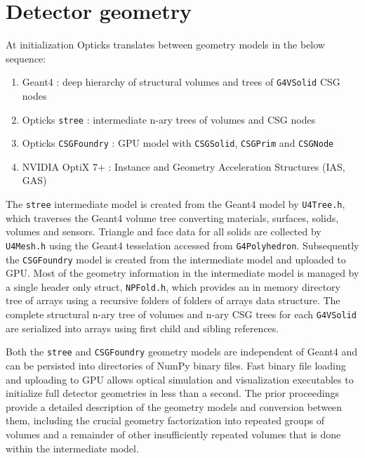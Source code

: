 \documentclass{webofc}
\begin{document}
\section{Detector geometry} 
\label{secgeom}%
At initialization Opticks translates between geometry models in the below sequence:
%
\begin{enumerate}
\item Geant4 : deep hierarchy of structural volumes and trees of {\tt G4VSolid} CSG nodes
\item Opticks {\tt stree} : intermediate n-ary trees of volumes and CSG nodes
\item Opticks {\tt CSGFoundry} : GPU model with {\tt CSGSolid}, {\tt CSGPrim} and {\tt CSGNode} 
\item NVIDIA OptiX 7+ : Instance and Geometry Acceleration Structures (IAS, GAS)
\end{enumerate}  
%
The {\tt stree} intermediate model is created from the Geant4 model by {\tt U4Tree.h},
which traverses the Geant4 volume tree converting materials, surfaces, solids, volumes and sensors.
Triangle and face data for all solids are collected by {\tt U4Mesh.h} using 
the Geant4 tesselation accessed from {\tt G4Polyhedron}. 
Subsequently the {\tt CSGFoundry} model is created from the intermediate model and uploaded to GPU.   
Most of the geometry information in the intermediate model is managed by a single header only struct, {\tt NPFold.h}, 
which provides an in memory directory tree of arrays using a recursive folders of folders of arrays data structure.
The complete structural n-ary tree of volumes and n-ary CSG trees for each {\tt G4VSolid} 
are serialized into arrays using first child and sibling references.

Both the {\tt stree} and {\tt CSGFoundry} geometry models are independent of Geant4 and can be persisted into directories of NumPy\cite{numpy} binary files. 
Fast binary file loading and uploading to GPU allows optical simulation and visualization
executables to initialize full detector geometries in less than a second.  
The prior proceedings\cite{chep2023} provide a detailed description of the geometry models and conversion between them,
including the crucial geometry factorization into repeated groups of volumes and a remainder of 
other insufficiently repeated volumes that is done within the intermediate model.
\end{document}
